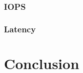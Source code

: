 \documentclass{acmsig}
\begin{document}
\subsubsection{IOPS}
\subsubsection{Latency}







\section{Conclusion}



% 
% 
\end{document}
